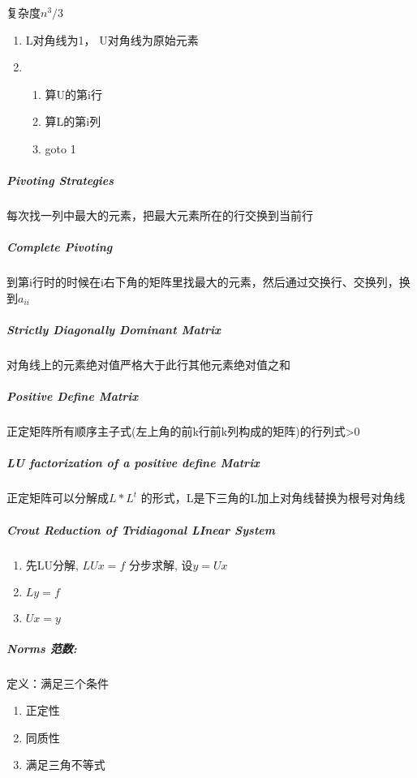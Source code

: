 \documentclass[]{article}
\let\oldsubparagraph\subparagraph
\renewcommand{\subparagraph}[1]{\oldsubparagraph{#1}\mbox{}}
\begin{document}
\begin{multicols}{3}
复杂度\( n^3 / 3\)

\begin{enumerate}
\def\labelenumi{\arabic{enumi}.}
\item
  L对角线为1， U对角线为原始元素
\item
  \begin{enumerate}
  \def\labelenumii{\arabic{enumii}.}
  \item
    算U的第i行
  \item
    算L的第i列
  \item
    goto 1
  \end{enumerate}
\end{enumerate}

\subparagraph{Pivoting Strategies}\label{header-c104}

每次找一列中最大的元素，把最大元素所在的行交换到当前行

\subparagraph{Complete Pivoting}\label{header-c109}

到第i行时的时候在i右下角的矩阵里找最大的元素，然后通过交换行、交换列，换到\(a_{ii}\)

\subparagraph{Strictly Diagonally Dominant Matrix}\label{header-c114}

对角线上的元素绝对值严格大于此行其他元素绝对值之和

\subparagraph{Positive Define Matrix}\label{header-c114}

正定矩阵所有顺序主子式(左上角的前k行前k列构成的矩阵)的行列式>0

\subparagraph{LU factorization of a positive define
Matrix}\label{header-c119}

正定矩阵可以分解成\( L * L^t\)
的形式，L是下三角的L加上对角线替换为根号对角线

\subparagraph{Crout Reduction of Tridiagonal LInear
System}\label{header-c124}

\begin{enumerate}
\def\labelenumi{\arabic{enumi}.}
\item
  先LU分解, \(LUx = f\) 分步求解, 设\(y = Ux\)
\item
  \(Ly = f\) 
\item
  \(Ux = y \)
\end{enumerate}


\subparagraph{Norms 范数:}\label{header-c139}

定义：满足三个条件

\begin{enumerate}
\def\labelenumi{\arabic{enumi}.}
\item
  正定性 
\item
  同质性
\item
  满足三角不等式
\end{enumerate}


\end{multicols}
\end{document}
